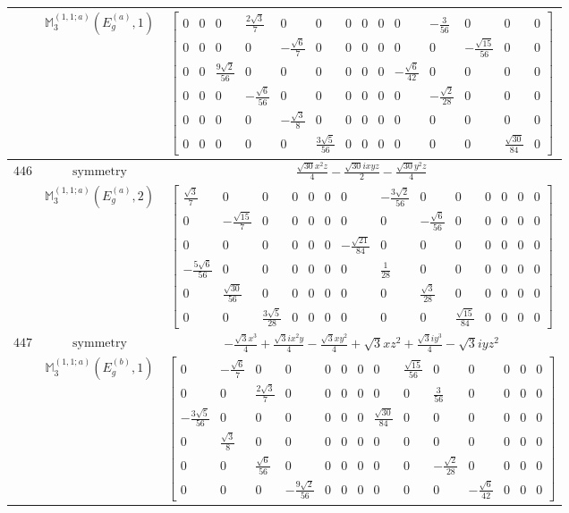 \documentclass[fleqn,8pt,landscape]{jsarticle}
\begin{document}
\begin{longtable}{ccc}
$  $ & $ \mathbb{M}_{3}^{(1,1;a)}(E_{g}^{(a)},1) $ & $ \begin{bmatrix} 0 & 0 & 0 & \frac{2 \sqrt{3}}{7} & 0 & 0 & 0 & 0 & 0 & 0 & - \frac{3}{56} & 0 & 0 & 0 \\ 0 & 0 & 0 & 0 & - \frac{\sqrt{6}}{7} & 0 & 0 & 0 & 0 & 0 & 0 & - \frac{\sqrt{15}}{56} & 0 & 0 \\ 0 & 0 & \frac{9 \sqrt{2}}{56} & 0 & 0 & 0 & 0 & 0 & 0 & - \frac{\sqrt{6}}{42} & 0 & 0 & 0 & 0 \\ 0 & 0 & 0 & - \frac{\sqrt{6}}{56} & 0 & 0 & 0 & 0 & 0 & 0 & - \frac{\sqrt{2}}{28} & 0 & 0 & 0 \\ 0 & 0 & 0 & 0 & - \frac{\sqrt{3}}{8} & 0 & 0 & 0 & 0 & 0 & 0 & 0 & 0 & 0 \\ 0 & 0 & 0 & 0 & 0 & \frac{3 \sqrt{5}}{56} & 0 & 0 & 0 & 0 & 0 & 0 & \frac{\sqrt{30}}{84} & 0 \end{bmatrix} $ \\ \hline
$ 446 $ & $ \text{symmetry} $ & $ \frac{\sqrt{30} x^{2} z}{4} - \frac{\sqrt{30} i x y z}{2} - \frac{\sqrt{30} y^{2} z}{4} $ \\
$  $ & $ \mathbb{M}_{3}^{(1,1;a)}(E_{g}^{(a)},2) $ & $ \begin{bmatrix} \frac{\sqrt{3}}{7} & 0 & 0 & 0 & 0 & 0 & 0 & - \frac{3 \sqrt{2}}{56} & 0 & 0 & 0 & 0 & 0 & 0 \\ 0 & - \frac{\sqrt{15}}{7} & 0 & 0 & 0 & 0 & 0 & 0 & - \frac{\sqrt{6}}{56} & 0 & 0 & 0 & 0 & 0 \\ 0 & 0 & 0 & 0 & 0 & 0 & - \frac{\sqrt{21}}{84} & 0 & 0 & 0 & 0 & 0 & 0 & 0 \\ - \frac{5 \sqrt{6}}{56} & 0 & 0 & 0 & 0 & 0 & 0 & \frac{1}{28} & 0 & 0 & 0 & 0 & 0 & 0 \\ 0 & \frac{\sqrt{30}}{56} & 0 & 0 & 0 & 0 & 0 & 0 & \frac{\sqrt{3}}{28} & 0 & 0 & 0 & 0 & 0 \\ 0 & 0 & \frac{3 \sqrt{5}}{28} & 0 & 0 & 0 & 0 & 0 & 0 & \frac{\sqrt{15}}{84} & 0 & 0 & 0 & 0 \end{bmatrix} $ \\ \hline
$ 447 $ & $ \text{symmetry} $ & $ - \frac{\sqrt{3} x^{3}}{4} + \frac{\sqrt{3} i x^{2} y}{4} - \frac{\sqrt{3} x y^{2}}{4} + \sqrt{3} x z^{2} + \frac{\sqrt{3} i y^{3}}{4} - \sqrt{3} i y z^{2} $ \\
$  $ & $ \mathbb{M}_{3}^{(1,1;a)}(E_{g}^{(b)},1) $ & $ \begin{bmatrix} 0 & - \frac{\sqrt{6}}{7} & 0 & 0 & 0 & 0 & 0 & 0 & \frac{\sqrt{15}}{56} & 0 & 0 & 0 & 0 & 0 \\ 0 & 0 & \frac{2 \sqrt{3}}{7} & 0 & 0 & 0 & 0 & 0 & 0 & \frac{3}{56} & 0 & 0 & 0 & 0 \\ - \frac{3 \sqrt{5}}{56} & 0 & 0 & 0 & 0 & 0 & 0 & \frac{\sqrt{30}}{84} & 0 & 0 & 0 & 0 & 0 & 0 \\ 0 & \frac{\sqrt{3}}{8} & 0 & 0 & 0 & 0 & 0 & 0 & 0 & 0 & 0 & 0 & 0 & 0 \\ 0 & 0 & \frac{\sqrt{6}}{56} & 0 & 0 & 0 & 0 & 0 & 0 & - \frac{\sqrt{2}}{28} & 0 & 0 & 0 & 0 \\ 0 & 0 & 0 & - \frac{9 \sqrt{2}}{56} & 0 & 0 & 0 & 0 & 0 & 0 & - \frac{\sqrt{6}}{42} & 0 & 0 & 0 \end{bmatrix} $ \\ \hline

\end{longtable}
\end{document}

